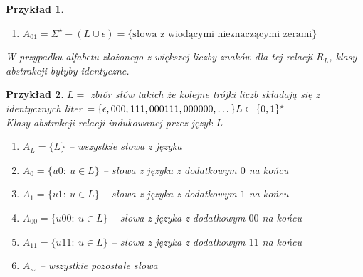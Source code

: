 \documentclass[12pt,a4paper]{article}
\newtheorem{przyklad}{Przykład}
\theoremstyle{definition}
\theoremstyle{remark}
\begin{document}
\begin{przyklad}
\begin{enumerate}
\begin{itemize}
					\begin{proof}
						Niech $u \in A_{10}$ i $v \not\in A_{10}$ wówczas $u = 1\dots$ 
						\begin{itemize}
							\item jeśli $v\ \neq \epsilon$ to znaczy $v = 0\dots $, wówczas dla $z = 1 \quad uz \in L \wedge vz \not\in L$
							\item jeśli $v = \epsilon$ to dla $z = \epsilon \quad uz \in L \wedge vz \not\in L$
							\footnote{Można skorzystać z tego że już udowodniliśmy że $\epsilon$ jest w innej klasie abstrakcji}
						\end{itemize}
					\end{proof}
				\end{itemize}
			\item $A_{01} = \Sigma^\star - (L \cup {\epsilon}) = \{ \text{słowa z wiodącymi nieznaczącymi zerami} \}$
		\end{enumerate}
		W przypadku alfabetu złożonego z większej liczby znaków dla tej relacji $R_L$, klasy abstrakcji byłyby identyczne.
	\end{przyklad}	
	
	\begin{przyklad}
		$L = $ zbiór słów takich że kolejne trójki liczb składają się z identycznych liter $ = \{\epsilon, 000, 111, 000111, 000000, \dots\}\\
		L \subset \{0, 1\}^\star$\\
		Klasy abstrakcji relacji indukowanej przez język $L$
		\begin{enumerate}
			\item $A_L = \{L\}$ -- wszystkie słowa z języka
			\item $A_0 = \{u0: ~ u\in L\}$ -- słowa z języka z dodatkowym $0$ na końcu
			\item $A_1 = \{u1: ~ u\in L\}$ -- słowa z języka z dodatkowym $1$ na końcu
			\item $A_{00} = \{u00: ~ u\in L\}$ -- słowa z języka z dodatkowym $00$ na końcu
			\item $A_{11} = \{u11: ~ u\in L\}$ -- słowa z języka z dodatkowym $11$ na końcu
			\item $A_\sim$ -- wszystkie pozostałe słowa
		\end{enumerate}
	\end{przyklad}		
	
\end{document}
